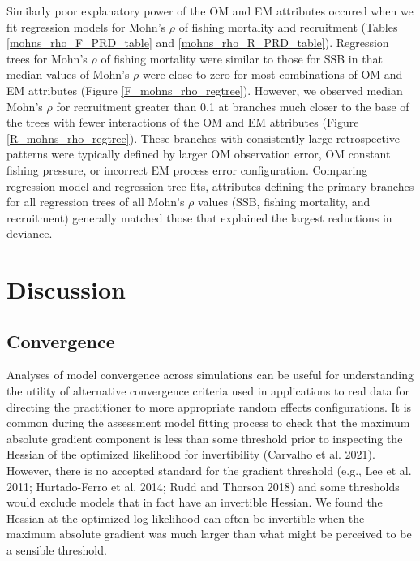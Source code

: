 \documentclass[
  12pt,
]{article}
\begin{document}
Similarly poor explanatory power of the OM and EM attributes occured
when we fit regression models for Mohn's \(\rho\) of fishing mortality
and recruitment (Tables \ref{mohns_rho_F_PRD_table} and
\ref{mohns_rho_R_PRD_table}). Regression trees for Mohn's \(\rho\) of
fishing mortality were similar to those for SSB in that median values of
Mohn's \(\rho\) were close to zero for most combinations of OM and EM
attributes (Figure \ref{F_mohns_rho_regtree}). However, we observed
median Mohn's \(\rho\) for recruitment greater than 0.1 at branches much
closer to the base of the trees with fewer interactions of the OM and EM
attributes (Figure \ref{R_mohns_rho_regtree}). These branches with
consistently large retrospective patterns were typically defined by
larger OM observation error, OM constant fishing pressure, or incorrect
EM process error configuration. Comparing regression model and
regression tree fits, attributes defining the primary branches for all
regression trees of all Mohn's \(\rho\) values (SSB, fishing mortality,
and recruitment) generally matched those that explained the largest
reductions in deviance.

\section*{Discussion}\label{discussion}

\subsection*{Convergence}\label{convergence-1}

Analyses of model convergence across simulations can be useful for
understanding the utility of alternative convergence criteria used in
applications to real data for directing the practitioner to more
appropriate random effects configurations. It is common during the
assessment model fitting process to check that the maximum absolute
gradient component is less than some threshold prior to inspecting the
Hessian of the optimized likelihood for invertibility (Carvalho et al.
2021). However, there is no accepted standard for the gradient threshold
(e.g., Lee et al. 2011; Hurtado-Ferro et al. 2014; Rudd and Thorson
2018) and some thresholds would exclude models that in fact have an
invertible Hessian. We found the Hessian at the optimized log-likelihood
can often be invertible when the maximum absolute gradient was much
larger than what might be perceived to be a sensible threshold.
\end{document}
